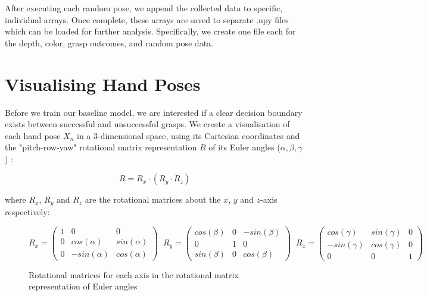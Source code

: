 \documentclass[11pt, a4paper]{report}
\theoremstyle{definition}
\begin{document}
After executing each random pose, we append the collected data to specific, individual arrays. Once complete, these arrays are saved to separate .npy files which can be loaded for further analysis. Specifically, we create one file each for the depth, color, grasp outcomes, and random pose data.

\newpage
\section{Visualising Hand Poses}
\label{sec:4.2}
Before we train our baseline model, we are interested if a clear decision boundary exists between successful and unsuccessful grasps. We create a visualisation of each hand pose $X_n$ in a 3-dimensional space, using its Cartesian coordinates and the "pitch-row-yaw" rotational matrix representation $R$ of its Euler angles ($\alpha,\beta,\gamma$) \cite{euleranglewolfram}:

\begin{equation}
    R=R_x\cdot(R_y\cdot R_z)
\end{equation}

\noindent where $R_x$, $R_y$ and $R_z$ are the rotational matrices about the $x$, $y$ and $z$-axis respectively:

\begin{figure}[H]
    \centering
    \begin{equation*}
        R_x = \begin{pmatrix}1&0&0 \\ 0&cos(\alpha)&sin(\alpha) \\ 0&-sin(\alpha)&cos(\alpha)\end{pmatrix}\;\;
        R_y = \begin{pmatrix}cos(\beta)&0&-sin(\beta) \\ 0&1&0 \\ sin(\beta)&0&cos(\beta)\end{pmatrix}\;\;
        R_z = \begin{pmatrix}cos(\gamma)&sin(\gamma)&0 \\ -sin(\gamma)&cos(\gamma)&0 \\ 0&0&1 \end{pmatrix}
    \end{equation*}
    \caption{Rotational matrices for each axis in the rotational matrix representation of Euler angles}
    \label{fig:rm_representation}
\end{figure}
\end{document}
